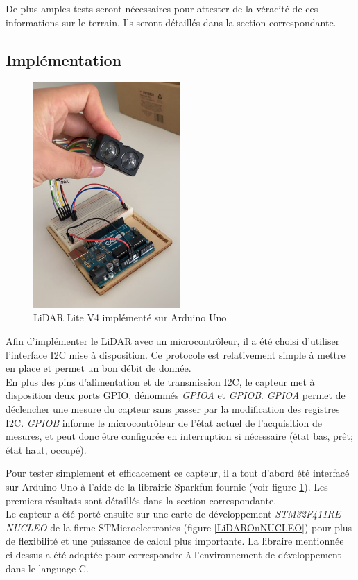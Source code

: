 De plus amples tests seront nécessaires pour attester de la véracité de ces informations sur le
terrain. Ils seront détaillés dans la section correspondante.

\subsection{Implémentation}

\begin{figure}[H]
    \centering
    \includegraphics[width=0.5\textwidth]{Images/LiDAR/LiDAROnArduino.jpeg}
    \caption{LiDAR Lite V4 implémenté sur Arduino Uno}
    \label{LiDAROnArduino}
\end{figure}

Afin d'implémenter le LiDAR avec un microcontrôleur, il a été choisi d'utiliser l'interface I2C
mise à disposition. Ce protocole est relativement simple à mettre en place et permet un bon débit de
donnée.\\
En plus des pins d'alimentation et de transmission I2C, le capteur met à disposition deux ports GPIO,
dénommés \emph{GPIOA} et \emph{GPIOB}. \emph{GPIOA} permet de déclencher une mesure du capteur sans
passer par la modification des registres I2C. \emph{GPIOB} informe le microcontrôleur de l'état actuel
de l'acquisition de mesures, et peut donc être configurée en interruption si nécessaire (état bas, prêt;
état haut, occupé).\par
Pour tester simplement et efficacement ce capteur, il a tout d'abord été interfacé sur Arduino Uno
à l'aide de la librairie Sparkfun fournie (voir figure \ref{LiDAROnArduino}). Les premiers résultats 
sont détaillés dans la section correspondante.\\
Le capteur a été porté ensuite sur une carte de développement \emph{STM32F411RE NUCLEO} de la firme 
STMicroelectronics (figure \ref{LiDAROnNUCLEO}) pour plus de flexibilité et une puissance de calcul plus importante. La libraire
mentionnée ci-dessus a été adaptée pour correspondre à l'environnement de développement dans le language
C.

